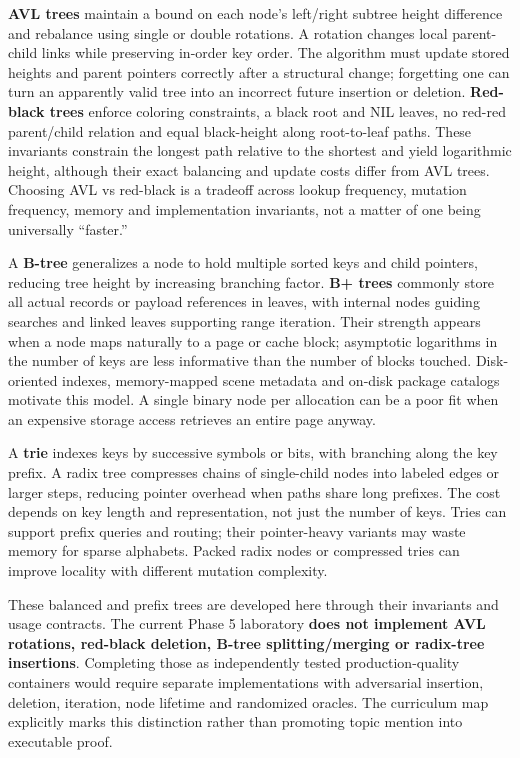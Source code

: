 \textbf{AVL trees} maintain a bound on each node's left/right subtree height difference and rebalance using single or double rotations. A rotation changes local parent-child links while preserving in-order key order. The algorithm must update stored heights and parent pointers correctly after a structural change; forgetting one can turn an apparently valid tree into an incorrect future insertion or deletion. \textbf{Red-black trees} enforce coloring constraints, a black root and NIL leaves, no red-red parent/child relation and equal black-height along root-to-leaf paths. These invariants constrain the longest path relative to the shortest and yield logarithmic height, although their exact balancing and update costs differ from AVL trees. Choosing AVL vs red-black is a tradeoff across lookup frequency, mutation frequency, memory and implementation invariants, not a matter of one being universally ``faster.''

A \textbf{B-tree} generalizes a node to hold multiple sorted keys and child pointers, reducing tree height by increasing branching factor. \textbf{B+ trees} commonly store all actual records or payload references in leaves, with internal nodes guiding searches and linked leaves supporting range iteration. Their strength appears when a node maps naturally to a page or cache block; asymptotic logarithms in the number of keys are less informative than the number of blocks touched. Disk-oriented indexes, memory-mapped scene metadata and on-disk package catalogs motivate this model. A single binary node per allocation can be a poor fit when an expensive storage access retrieves an entire page anyway.

A \textbf{trie} indexes keys by successive symbols or bits, with branching along the key prefix. A radix tree compresses chains of single-child nodes into labeled edges or larger steps, reducing pointer overhead when paths share long prefixes. The cost depends on key length and representation, not just the number of keys. Tries can support prefix queries and routing; their pointer-heavy variants may waste memory for sparse alphabets. Packed radix nodes or compressed tries can improve locality with different mutation complexity.

These balanced and prefix trees are developed here through their invariants and usage contracts. The current Phase 5 laboratory \textbf{does not implement AVL rotations, red-black deletion, B-tree splitting/merging or radix-tree insertions}. Completing those as independently tested production-quality containers would require separate implementations with adversarial insertion, deletion, iteration, node lifetime and randomized oracles. The curriculum map explicitly marks this distinction rather than promoting topic mention into executable proof.

